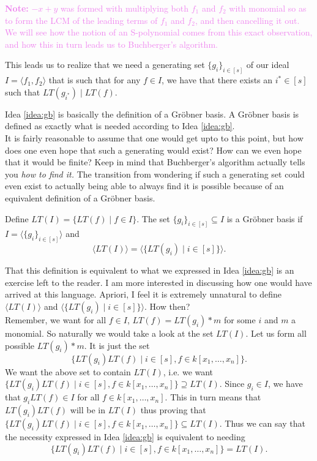 \documentclass[10pt]{article}
\newcommand{\gb}{Gr\"{o}bner }
\newcommand*{\ideal}[1]{\langle#1\rangle}
\begin{document}
\begin{mdframed}
\textcolor{Violet}{\textbf{Note:} $-x + y$ was formed with multiplying both $f_1$ and $f_2$ with monomial so as to form the LCM of the leading terms of $f_1$ and $f_2$, and then cancelling it out. We will see how the notion of an S-polynomial comes from this exact observation, and how this in turn leads us to Buchberger's algorithm.}
\end{mdframed}

\begin{ideabox}
\label{idea:gb}
This leads us to realize that we need a generating set $\{g_i\}_{i \in [s]}$ of our ideal $I = \ideal{f_1, f_2}$ that is such that for any $f \in I$, we have that there exists an $i^* \in [s]$ such that $LT(g_{i^*}) \mid LT(f)$.
\end{ideabox}

Idea \ref{idea:gb} is basically the definition of a \gb basis. A \gb basis is defined as exactly what is needed according to Idea \ref{idea:gb}. \\

It is fairly reasonable to assume that one would get upto to this point, but how does one even hope that such a generating would exist? How can we even hope that it would be finite? Keep in mind that Buchberger's algorithm actually tells you \emph{how to find it.} The transition from wondering if such a generating set could even exist to actually being able to always find it is possible because of an equivalent definition of a \gb basis.

\begin{definition}
\label{def:gb-as-ideals}
Define $LT(I) = \{LT(f) \mid f \in I\}$. The set $\{g_i\}_{i \in [s]} \subseteq I$ is a \gb basis if $I = \ideal{\{g_i\}_{i \in [s]}}$ and
\[
\ideal{LT(I)} = \ideal{\{LT(g_i) \mid i \in [s]\}}.
\]
\end{definition}

That this definition is equivalent to what we expressed in Idea \ref{idea:gb} is an exercise left to the reader. I am more interested in discussing how one would have arrived at this language. Apriori, I feel it is extremely unnatural to define $\ideal{LT(I)}$ and $\ideal{\{LT(g_i) \mid i \in [s]\}}$. How then? \\

Remember, we want for all $f \in I$, $LT(f) = LT(g_i) * m$ for some $i$ and $m$ a monomial. So naturally we would take a look at the set $LT(I)$. Let us form all possible $LT(g_i) * m$. It is just the set
\[
\{LT(g_i)LT(f) \mid i \in [s], f \in k[x_1, \ldots, x_n]\}.
\]
We want the above set to contain $LT(I)$, i.e. we want $\{LT(g_i)LT(f) \mid i \in [s], f \in k[x_1, \ldots, x_n]\} \supseteq LT(I)$. Since $g_i \in I$, we have that $g_iLT(f) \in I$ for all $f \in k[x_1, \ldots, x_n]$. This in turn means that $LT(g_i)LT(f)$ will be in $LT(I)$ thus proving that $\{LT(g_i)LT(f) \mid i \in [s], f \in k[x_1, \ldots, x_n]\} \subseteq LT(I)$. Thus we can say that the necessity expressed in Idea \ref{idea:gb} is equivalent to needing
\[\{LT(g_i)LT(f) \mid i \in [s], f \in k[x_1, \ldots, x_n]\} = LT(I).\]
\end{document}
